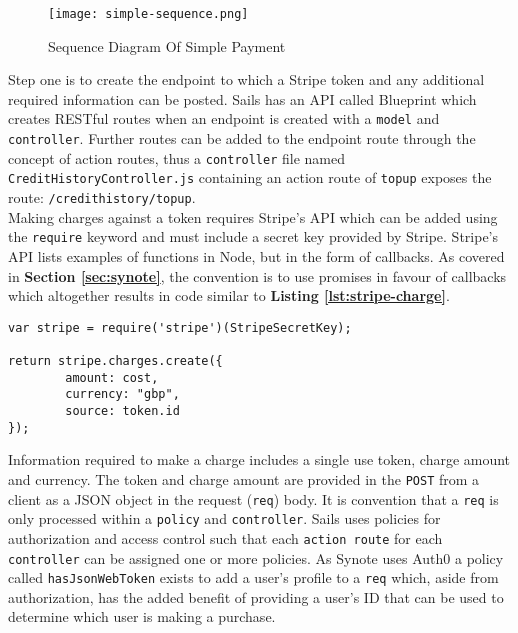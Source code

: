 \begin{figure}[!hbt]
  	\centering
 	\texttt{[image: simple-sequence.png]}
  	\caption{Sequence Diagram Of Simple Payment}
 	\label{fig:simple-sequence}
\end{figure}

Step one is to create the endpoint to which a Stripe token and any additional required information can be posted. Sails has an API called Blueprint which creates RESTful routes when an endpoint is created with a \texttt{model} and \texttt{controller}. Further routes can be added to the endpoint route through the concept of action routes, thus a \texttt{controller} file named \texttt{CreditHistoryController.js} containing an action route of \texttt{topup} exposes the route: \texttt{/credithistory/topup}.\\

Making charges against a token requires Stripe's API \cite{stripe-api} which can be added using the \texttt{require} keyword and must include a secret key provided by Stripe. Stripe's API lists examples of functions in Node, but in the form of callbacks. As covered in \textbf{Section \ref{sec:synote}}, the convention is to use promises in favour of callbacks which altogether results in code similar to \textbf{Listing \ref{lst:stripe-charge}}.\\

\hspace{0.1\textwidth}
\begin{minipage}{.76\textwidth}
\begin{lstlisting}[caption=Stripe Charge Promisified Example, label={lst:stripe-charge}]
var stripe = require('stripe')(StripeSecretKey);

return stripe.charges.create({
        amount: cost,
        currency: "gbp",
        source: token.id
});
\end{lstlisting}
\end{minipage}
\hspace{0.1\textwidth}

Information required to make a charge includes a single use token, charge amount and currency. The token and charge amount are provided in the \texttt{POST} from a client as a JSON object in the request (\texttt{req}) body. It is convention that a \texttt{req} is only processed within a \texttt{policy} and \texttt{controller}. Sails uses policies for authorization and access control such that each \texttt{action route} for each \texttt{controller} can be assigned one or more policies. As Synote uses Auth0 \cite{auth0} a policy called \texttt{hasJsonWebToken} exists to add a user's profile to a \texttt{req} which, aside from authorization, has the added benefit of providing a user's ID that can be used to determine which user is making a purchase.\\

